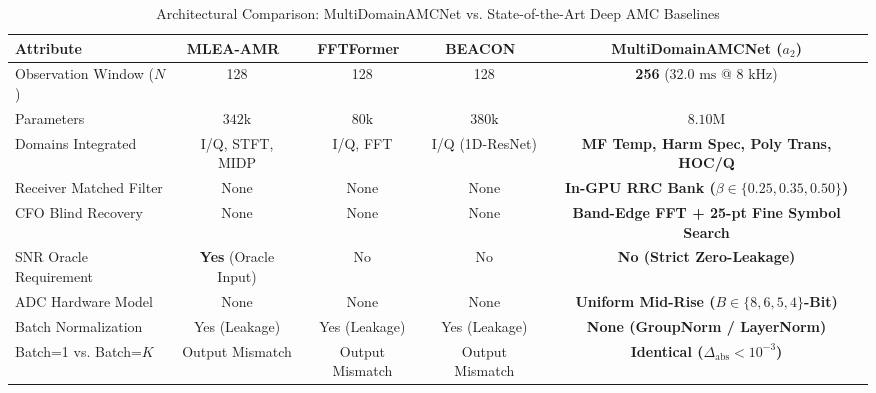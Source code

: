\begin{table}[!t]
\caption{Architectural Comparison: MultiDomainAMCNet vs. State-of-the-Art Deep AMC Baselines}
\label{tab:arch_comparison}
\centering
\footnotesize
\begin{tabular}{lcccc}
\toprule
\textbf{Attribute} & \textbf{MLEA-AMR}~\cite{gao2026mlea} & \textbf{FFTFormer}~\cite{quan2026fftformer} & \textbf{BEACON}~\cite{liu2026beacon} & \textbf{MultiDomainAMCNet ($a_2$)} \\
\midrule
Observation Window ($N$) & 128 & 128 & 128 & \textbf{256} ($32.0\text{ ms}$ @ $8\text{ kHz}$) \\
Parameters & $342\text{k}$ & $80\text{k}$ & $380\text{k}$ & $8.10\text{M}$ \\
Domains Integrated & I/Q, STFT, MIDP & I/Q, FFT & I/Q (1D-ResNet) & \textbf{MF Temp, Harm Spec, Poly Trans, HOC/Q} \\
Receiver Matched Filter & None & None & None & \textbf{In-GPU RRC Bank ($\beta\in\{0.25,0.35,0.50\}$)} \\
CFO Blind Recovery & None & None & None & \textbf{Band-Edge FFT + 25-pt Fine Symbol Search} \\
SNR Oracle Requirement & \textbf{Yes} (Oracle Input) & No & No & \textbf{No (Strict Zero-Leakage)} \\
ADC Hardware Model & None & None & None & \textbf{Uniform Mid-Rise ($B\in\{8,6,5,4\}$-Bit)} \\
Batch Normalization & Yes (Leakage) & Yes (Leakage) & Yes (Leakage) & \textbf{None (GroupNorm / LayerNorm)} \\
Batch=1 vs. Batch=$K$ & Output Mismatch & Output Mismatch & Output Mismatch & \textbf{Identical ($\Delta_{\text{abs}} < 10^{-3}$)} \\
\bottomrule
\end{tabular}
\end{table}
